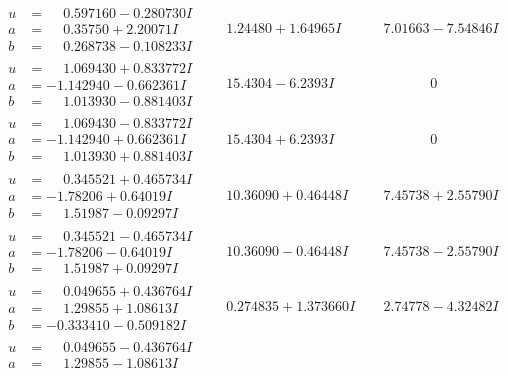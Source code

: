 \documentclass[1p]{elsarticle_modified}
\theoremstyle{definition}
\begin{document}
$$\begin{array}{c|c|c}
\begin{aligned}
u &= \phantom{-}0.597160 - 0.280730 I \\
a &= \phantom{-}0.35750 + 2.20071 I \\
b &= \phantom{-}0.268738 - 0.108233 I\end{aligned}
 & \phantom{-}1.24480 + 1.64965 I & \phantom{-}7.01663 - 7.54846 I \\ \hline\begin{aligned}
u &= \phantom{-}1.069430 + 0.833772 I \\
a &= -1.142940 - 0.662361 I \\
b &= \phantom{-}1.013930 - 0.881403 I\end{aligned}
 & \phantom{-}15.4304 - 6.2393 I & \phantom{-0.000000 } 0 \\ \hline\begin{aligned}
u &= \phantom{-}1.069430 - 0.833772 I \\
a &= -1.142940 + 0.662361 I \\
b &= \phantom{-}1.013930 + 0.881403 I\end{aligned}
 & \phantom{-}15.4304 + 6.2393 I & \phantom{-0.000000 } 0 \\ \hline\begin{aligned}
u &= \phantom{-}0.345521 + 0.465734 I \\
a &= -1.78206 + 0.64019 I \\
b &= \phantom{-}1.51987 - 0.09297 I\end{aligned}
 & \phantom{-}10.36090 + 0.46448 I & \phantom{-}7.45738 + 2.55790 I \\ \hline\begin{aligned}
u &= \phantom{-}0.345521 - 0.465734 I \\
a &= -1.78206 - 0.64019 I \\
b &= \phantom{-}1.51987 + 0.09297 I\end{aligned}
 & \phantom{-}10.36090 - 0.46448 I & \phantom{-}7.45738 - 2.55790 I \\ \hline\begin{aligned}
u &= \phantom{-}0.049655 + 0.436764 I \\
a &= \phantom{-}1.29855 + 1.08613 I \\
b &= -0.333410 - 0.509182 I\end{aligned}
 & \phantom{-}0.274835 + 1.373660 I & \phantom{-}2.74778 - 4.32482 I \\ \hline\begin{aligned}
u &= \phantom{-}0.049655 - 0.436764 I \\
a &= \phantom{-}1.29855 - 1.08613 I \\

\end{aligned}
\end{array}$$
\end{document}
